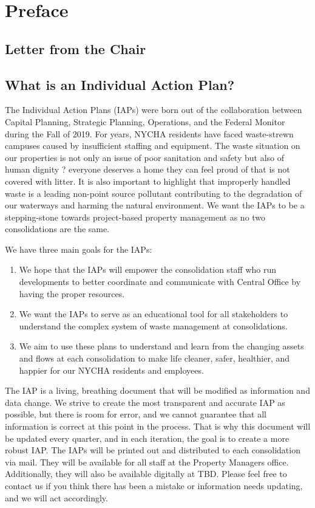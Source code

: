 \chapter{Preface}

\section{Letter from the Chair}\label{sec:Section1}
\clearpage
{\selectfont
\section{What is an Individual Action Plan?}

The Individual Action Plans (IAPs) were born out of the collaboration between Capital Planning, Strategic Planning, Operations, and the Federal Monitor during the Fall of 2019. For years, NYCHA residents have faced waste-strewn campuses caused by insufficient staffing and equipment. The waste situation on our properties is not only an issue of poor sanitation and safety but also of human dignity ? everyone deserves a home they can feel proud of that is not covered with litter. It is also important to highlight that improperly handled waste is a leading non-point source pollutant contributing to the degradation of our waterways and harming the natural environment. We want the IAPs to be a stepping-stone towards project-based property management as no two consolidations are the same. 

We have three main goals for the IAPs: 
\begin{enumerate}
\item We hope that the IAPs will empower the consolidation staff who run developments to better coordinate and communicate with Central Office by having the proper resources. 
\item We want the IAPs to serve as an educational tool for all stakeholders to understand the complex system of waste management at consolidations. 
\item We aim to use these plans to understand and learn from the changing assets and flows at each consolidation to make life cleaner, safer, healthier, and happier for our NYCHA residents and employees. 
\end{enumerate}

The IAP is a living, breathing document that will be modified as information and data change. We strive to create the most transparent and accurate IAP as possible, but there is room for error, and we cannot guarantee that all information is correct at this point in the process. That is why this document will be updated every quarter, and in each iteration, the goal is to create a more robust IAP. The IAPs will be printed out and distributed to each consolidation via mail. They will be available for all staff at the Property Managers office. Additionally, they will also be available digitally at TBD. Please feel free to contact us if you think there has been a mistake or information needs updating, and we will act accordingly. 


}
